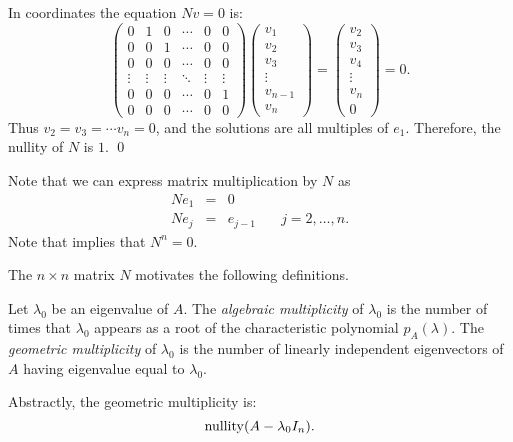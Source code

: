 \proof  In coordinates the equation $Nv=0$ is:
\[
\left(\begin{array}{cccccc} 0 & 1 & 0 & \cdots & 0 & 0\\
	0 & 0 & 1 & \cdots & 0 & 0 \\
	0 & 0 & 0  & \cdots & 0 & 0\\
	\vdots & \vdots & \vdots & \ddots & \vdots & \vdots\\
	0 & 0 & 0 & \cdots & 0 & 1 \\
	0 & 0 & 0 & \cdots & 0 & 0 \end{array}\right)
\left(\begin{array}{l} v_1 \\ v_2 \\ v_3 \\ \vdots \\ v_{n-1} \\v_n
	\end{array}\right) 
= \left(\begin{array}{l} v_2 \\ v_3 \\ v_4 \\ \vdots \\ v_n \\ 0
	\end{array}\right) = 0.
\]
Thus $v_2 = v_3 = \cdots v_n = 0$, and the solutions are all multiples 
of $e_1$.  Therefore, the nullity of $N$ is $1$.  \qed

Note that we can express matrix multiplication by $N$ as
\begin{equation}  \label{e:Ndef}
\begin{array}{rcll} 
Ne_1 & = & 0 & \\
Ne_j & = & e_{j-1} & \quad j=2,\ldots,n .
\end{array}
\end{equation}
Note that  implies that $N^n=0$.

The $n\times n$ matrix $N$ motivates the following definitions.  
\begin{Def} \label{D:multiplicities}
Let $\lambda_0$ be an eigenvalue of $A$.  The {\em algebraic multiplicity\/} 
 of $\lambda_0$ is the number of times 
that $\lambda_0$ appears as a root of the characteristic polynomial 
$p_A(\lambda)$.  The {\em geometric multiplicity\/} 
 of $\lambda_0$ is the number of linearly 
independent eigenvectors of $A$ having eigenvalue equal to $\lambda_0$.
\end{Def}  
Abstractly, the geometric multiplicity is:
\[
{\rm nullity}(A-\lambda_0I_n).
\]


